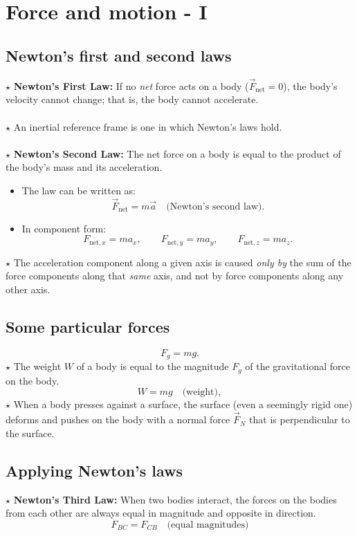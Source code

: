 \section{Force and motion - I}

\subsection{Newton's first and second laws}
$\star$ \textbf{Newton's First Law:} If no \textit{net} force acts on a body ($\vec{F}_{\text{net}} = 0$), the body's velocity cannot change; that is, the body cannot accelerate.\\\\
$\star$ An inertial reference frame is one in which Newton’s laws hold.\\\\
$\star$ \textbf{Newton's Second Law:} The net force on a body is equal to the product of the body's mass and its acceleration.
\begin{itemize}
    \item The law can be written as:
    \[
    \vec{F}_{\text{net}} = m\vec{a} \quad \text{(Newton's second law).}
    \]
    \item In component form:
    \[
    F_{\text{net},x} = ma_x, \qquad
    F_{\text{net},y} = ma_y, \qquad
    F_{\text{net},z} = ma_z.
    \]
\end{itemize}
$\star$ The acceleration component along a given axis is caused \textit{only by} the sum of the force components along that \textit{same} axis, and not by force components along any other axis.

\subsection{Some particular forces}
\[
F_g = mg.
\]
$\star$ The weight $W$ of a body is equal to the magnitude $F_g$ of the gravitational force on the body.
\[
W = mg \quad \text{(weight)},
\]
$\star$ When a body presses against a surface, the surface (even a seemingly rigid one) deforms and pushes on the body with a normal force $\vec{F}_N$ that is perpendicular to the surface.

\subsection{Applying Newton's laws}
$\star$ \textbf{Newton's Third Law:} When two bodies interact, the forces on the bodies from each other are always equal in magnitude and opposite in direction.
\[
F_{BC} = F_{CB} \quad \text{(equal magnitudes)}
\]